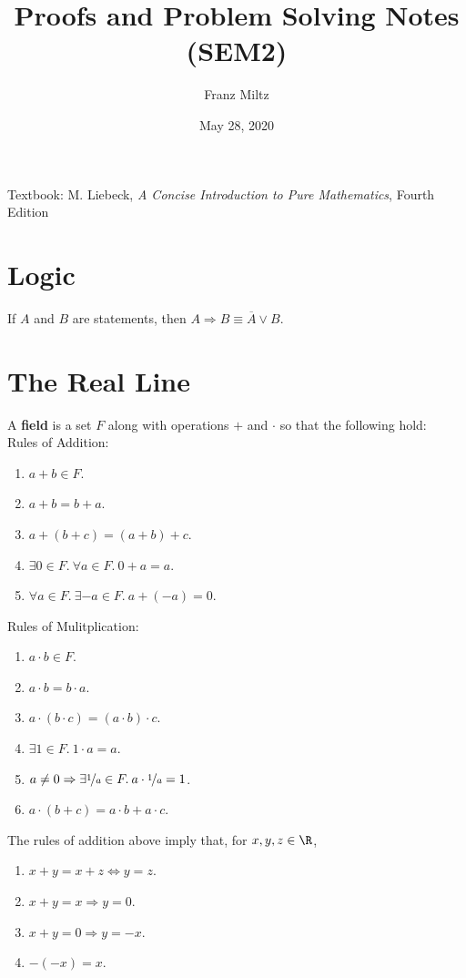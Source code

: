 \documentclass{article}
\begin{document}
\title{Proofs and Problem Solving Notes (SEM2)}
\author{Franz Miltz}
\date{May 28, 2020}
\maketitle
\noindent Textbook: M. Liebeck, \emph{A Concise Introduction to Pure Mathematics}, Fourth Edition
\mkthms
\tableofcontents
\pagebreak
\section{Logic}
\begin{theorem}
    If $A$ and $B$ are statements, then $A\Rightarrow B\equiv \overline{A}\vee B$.
\end{theorem}
\section{The Real Line}
\begin{definition}
    A \textbf{field} is a set $F$ along with operations $+$ and $\cdot$ so that the following hold:\\
    Rules of Addition:
    \begin{enumerate}
        \item $a+b\in F$.
        \item $a+b = b+a$.
        \item $a+(b+c) = (a+b)+c$.
        \item $\exists 0\in F.\: \forall a\in F.\: 0+a=a$.
        \item $\forall a\in F.\: \exists -a\in F.\: a+(-a)=0$.
    \end{enumerate}
    Rules of Mulitplication:
    \begin{enumerate}
        \item $a\cdot b \in F$.
        \item $a\cdot b = b\cdot a$.
        \item $a\cdot(b\cdot c)=(a\cdot b)\cdot c$.
        \item $\exists 1\in F.\: 1\cdot a = a$.
        \item $a\not=0\Rightarrow\exists \nicefrac{1}{a}\in F.\: a\cdot\nicefrac{1}{a}=1$.
        \item $a\cdot (b+c) = a\cdot b + a\cdot c$.
    \end{enumerate}
\end{definition}
\begin{theorem}
    The rules of addition above imply that, for $x,y,z\in \R$,
    \begin{enumerate}
        \item $x+y=x+z\Leftrightarrow y=z$.
        \item $x+y=x\Rightarrow y=0$.
        \item $x+y=0\Rightarrow y=-x$.
        \item $-(-x)=x$.
    \end{enumerate}
\end{theorem}
\end{document}
